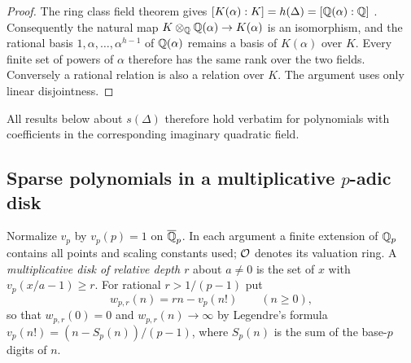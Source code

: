 
\begin{proof}
The ring class field theorem gives $[K(\alpha):K]=h(\Delta)=[\mathbb{Q}(\alpha):\mathbb{Q}]$
\cite{Cox2013Primes}. Consequently the natural map $K\otimes_{\mathbb{Q}}\mathbb{Q}(\alpha)\to K(\alpha)$ is
an isomorphism, and the rational basis $1,\alpha,\dots,\alpha^{h-1}$ of $\mathbb{Q}(\alpha)$ remains
a basis of $K(\alpha)$ over $K$. Every finite set of powers of $\alpha$ therefore has the
same rank over the two fields. Conversely a rational relation is also a relation over $K$.
The argument uses only linear disjointness.
\end{proof}

All results below about $s(\Delta)$ therefore hold verbatim for polynomials with
coefficients in the corresponding imaginary quadratic field.

\subsection{Sparse polynomials in a multiplicative \texorpdfstring{$p$}{p}-adic disk}\label{smd:sec:disk}
{\raggedright{}}

Normalize $v_p$ by $v_p(p)=1$ on $\overline{\mathbb{Q}}_p$. In each argument a finite extension of
$\mathbb{Q}_p$ contains all points and scaling constants used; $\mathcal{O}$ denotes its valuation ring. A
\emph{multiplicative disk of relative depth $r$} about $a\ne0$ is the set of $x$ with
$v_p(x/a-1)\ge r$. For rational $r>1/(p-1)$ put
\[
 w_{p,r}(n)=rn-v_p(n!)\qquad(n\ge0),
\]
so that $w_{p,r}(0)=0$ and $w_{p,r}(n)\to\infty$ by Legendre's formula
$v_p(n!)=(n-S_p(n))/(p-1)$, where $S_p(n)$ is the sum of the base-$p$ digits of $n$.


